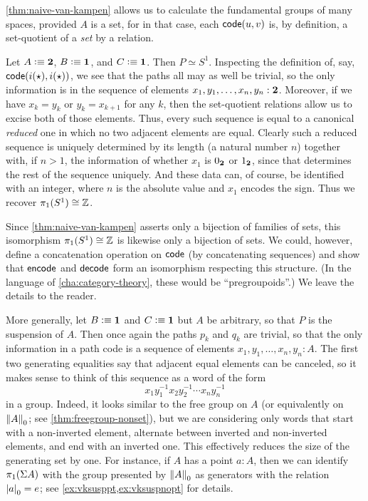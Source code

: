 \autoref{thm:naive-van-kampen} allows us to calculate the fundamental groups of many spaces, provided $A$ is a set,
for in that case, each $\code(u,v)$ is, by definition, a set-quotient of a \emph{set} by a relation.

\begin{eg}\label{eg:circle}
  Let $A\defeq \bool$, $B\defeq\unit$, and $C\defeq \unit$.
  Then $P \simeq S^1$.
  Inspecting the definition of, say, $\code(i(\ttt),i(\ttt))$, we see that the paths all may as well be trivial, so the only information is in the sequence of elements $x_1,y_1,\dots,x_n,y_n: \bool$.
  Moreover, if we have $x_k=y_k$ or $y_k=x_{k+1}$ for any $k$, then the set-quotient relations allow us to excise both of those elements.
  Thus, every such sequence is equal to a canonical \emph{reduced} one in which no two adjacent elements are equal.
  Clearly such a reduced sequence is uniquely determined by its length (a natural number $n$) together with, if $n>1$, the information of whether $x_1$ is $\bfalse$ or $\btrue$, since that determines the rest of the sequence uniquely.
  And these data can, of course, be identified with an integer, where $n$ is the absolute value and $x_1$ encodes the sign.
  Thus we recover $\pi_1(S^1)\cong \Z$.
\end{eg}

Since \autoref{thm:naive-van-kampen} asserts only a bijection of families of sets, this isomorphism $\pi_1(S^1)\cong \Z$ is likewise only a bijection of sets.
We could, however, define a concatenation operation on $\code$ (by concatenating sequences) and show that $\encode$ and $\decode$ form an isomorphism respecting this structure.
(In the language of \autoref{cha:category-theory}, these would be ``pregroupoids''.)
We leave the details to the reader.

\begin{eg}\label{eg:suspension}
  More generally, let $B\defeq\unit$ and $C\defeq \unit$ but $A$ be arbitrary, so that $P$ is the suspension of $A$.
  Then once again the paths $p_k$ and $q_k$ are trivial, so that the only information in a path code is a sequence of elements $x_1,y_1,\dots,x_n,y_n: A$.
  The first two generating equalities say that adjacent equal elements can be canceled, so it makes sense to think of this sequence as a word of the form
  \[ x_1 y_1^{-1} x_2 y_2^{-1} \cdots x_n y_n^{-1} \]
  in a group.
  Indeed, it looks similar to the free group on $A$ (or equivalently on $\trunc0A$; see \autoref{thm:freegroup-nonset}), but we are considering only words that start with a non-inverted element, alternate between inverted and non-inverted elements, and end with an inverted one.
  This effectively reduces the size of the generating set by one.
  For instance, if $A$ has a point $a:A$, then we can identify $\pi_1(\susp A)$ with the group presented by $\trunc0A$ as generators with the relation $\tproj0a = e$; see \autoref{ex:vksusppt,ex:vksuspnopt} for details.
\end{eg}

